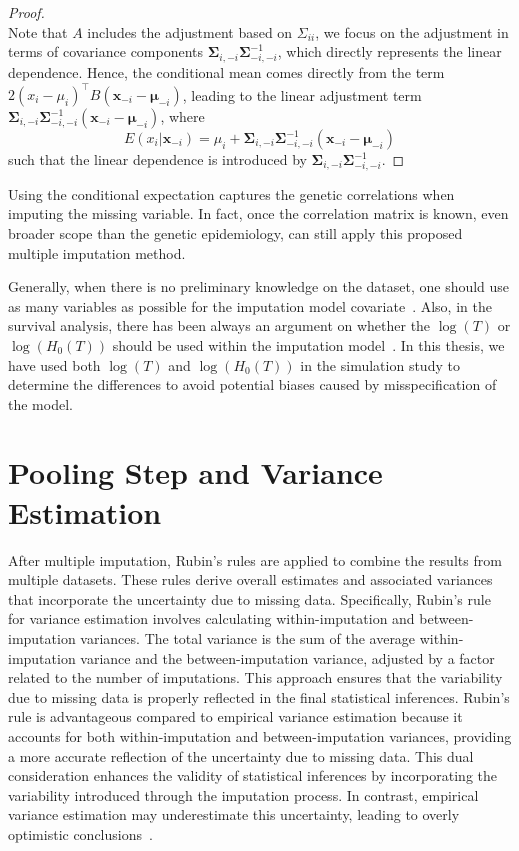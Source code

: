 \begin{proof}
\begin{equation}
    \end{equation}
    Note that $A$ includes the adjustment based on $\Sigma_{ii}$, we focus on the adjustment in terms of covariance components $\boldsymbol{\Sigma}_{i,-i}\boldsymbol{\Sigma}_{-i,-i}^{-1}$, which directly represents the linear dependence. 
    Hence, the conditional mean comes directly from the term $2(x_i - \mu_i)^{\top} B (\mathbf{x}_{-i} - \boldsymbol{\mu}_{-i})$, leading to the linear adjustment term \(\boldsymbol{\Sigma}_{i,-i} \boldsymbol{\Sigma}_{-i,-i}^{-1} (\mathbf{x}_{-i} - \boldsymbol{\mu}_{-i})\), where
    \begin{equation*}
        E(x_i|\mathbf{x}_{-i})=\mu_i+\boldsymbol{\Sigma}_{i,-i}\boldsymbol{\Sigma}_{-i,-i}^{-1}(\mathbf{x}_{-i}-\boldsymbol{\mu}_{-i})
    \end{equation*}
    such that the linear dependence is introduced by $\boldsymbol{\Sigma}_{i,-i}\boldsymbol{\Sigma}_{-i,-i}^{-1}$. 
\end{proof}
Using the conditional expectation captures the genetic correlations when imputing the missing variable. 
In fact, once the correlation matrix is known, even broader scope than the genetic epidemiology, can still apply this proposed multiple imputation method.

Generally, when there is no preliminary knowledge on the dataset, one should use as many variables as possible for the imputation model covariate~\cite{rubin2018multiple}.
Also, in the survival analysis, there has been always an argument on whether the $\log(T)$ or $\log(H_0(T))$ should be used within the imputation model~\cite{white2009imputing}. 
In this thesis, we have used both $\log(T)$ and $\log(H_0(T))$ in the simulation study to determine the differences to avoid potential biases caused by misspecification of the model. 

\section{Pooling Step and Variance Estimation}
After multiple imputation, Rubin's rules are applied to combine the results from multiple datasets.
These rules derive overall estimates and associated variances that incorporate the uncertainty due to missing data.
Specifically, Rubin's rule for variance estimation involves calculating within-imputation and between-imputation variances.
The total variance is the sum of the average within-imputation variance and the between-imputation variance, adjusted by a factor related to the number of imputations.
This approach ensures that the variability due to missing data is properly reflected in the final statistical inferences.
Rubin's rule is advantageous compared to empirical variance estimation because it accounts for both within-imputation and between-imputation variances, providing a more accurate reflection of the uncertainty due to missing data.
This dual consideration enhances the validity of statistical inferences by incorporating the variability introduced through the imputation process. 
In contrast, empirical variance estimation may underestimate this uncertainty, leading to overly optimistic conclusions~\cite{rubin2018multiple}.

